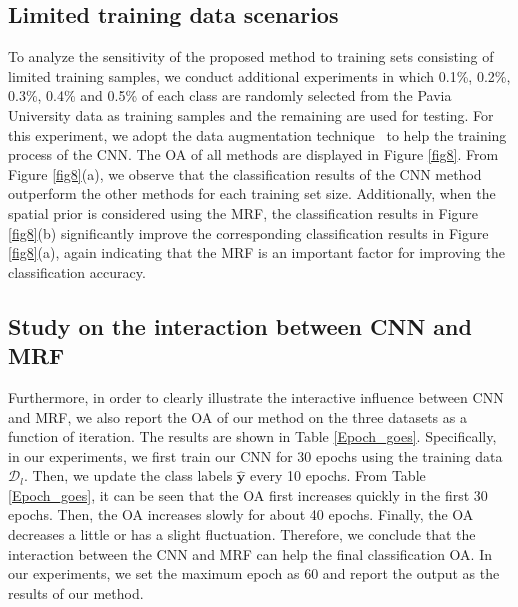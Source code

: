 \documentclass[journal]{IEEEtran}
\begin{document}
		\subsection{Limited training data scenarios}
		To analyze the sensitivity of the proposed method to training sets consisting of limited training samples, we conduct additional experiments in which 0.1\%, 0.2\%, 0.3\%, 0.4\% and 0.5\% of each class are randomly selected from the Pavia University data as training samples and the remaining are used for testing. For this experiment, we adopt the data augmentation technique~\cite{krizhevsky2012imagenet} to help the training process of the CNN. The OA of all methods are displayed in Figure  \ref{fig8}. From Figure \ref{fig8}(a), we observe that the classification results of the CNN method outperform the other methods for each training set size. Additionally, when the spatial prior is considered using the MRF, the {{classification}} results in Figure \ref{fig8}(b) significantly improve the corresponding classification results in Figure  \ref{fig8}(a), again indicating that the MRF is an important factor for improving the classification accuracy.
		
		\subsection{Study on the interaction between CNN and MRF}
		{{Furthermore, in order to clearly illustrate the interactive influence between CNN and MRF, we also report the OA of our method on the three datasets as a function of iteration. The results are shown in Table \ref{Epoch_goes}. Specifically, in our experiments, we first train our CNN for 30 epochs using the training data $\mathcal{D}_{l}$. Then, we update the class labels $\widehat{\mathbf{y}}$ every 10 epochs. From Table \ref{Epoch_goes}, it can be seen that the OA first increases quickly in the first 30 epochs. Then, the OA increases slowly for about 40 epochs. Finally, the OA decreases a little or has a slight fluctuation. Therefore, we conclude that the interaction between the CNN and MRF can help the final classification OA. In our experiments, we set the maximum epoch as 60 and report the output as the results of our method.}}
		
\end{document}
